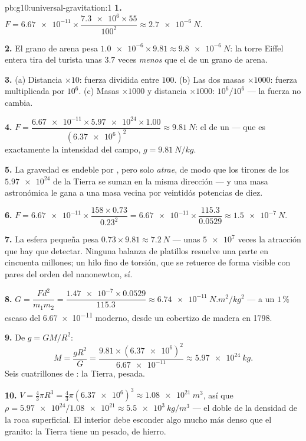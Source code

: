 \begin{solution}{pb:g10:universal-gravitation:1}
\textbf{1.} $F = \num{6.67e-11} \times
\dfrac{\num{7.3e6} \times 55}{100^2} \approx \qty{2.7e-6}{N}$.

\textbf{2.} El grano de arena pesa
$\num{1.0e-6} \times 9.81 \approx \qty{9.8e-6}{N}$: la torre Eiffel
entera tira del turista unas $3.7$ veces \emph{menos} que el  de un
grano de arena.

\textbf{3.} (a) Distancia $\times 10$: fuerza dividida entre $100$.
(b) Las dos masas $\times 1000$: fuerza multiplicada por $10^6$.
(c) Masas $\times 1000$ y distancia $\times 1000$: $10^6 / 10^6$ --- la
fuerza no cambia.

\textbf{4.} $F = \dfrac{\num{6.67e-11} \times \num{5.97e24} \times
1.00}{(\num{6.37e6})^2} \approx \qty{9.81}{N}$: el  de un 
--- que es exactamente la intensidad del campo,
$g = \qty{9.81}{N/kg}$.

\textbf{5.} La gravedad es endeble por , pero solo
\emph{atrae}, de modo que los tirones de los $\num{5.97e24}$ 
de la Tierra se suman en la misma dirección --- y una masa astronómica
le gana a una masa vecina por veintidós potencias de diez.

\textbf{6.} $F = \num{6.67e-11} \times \dfrac{158 \times 0.73}{0.23^2}
= \num{6.67e-11} \times \dfrac{115.3}{0.0529}
\approx \qty{1.5e-7}{N}$.

\textbf{7.} La esfera pequeña pesa
$0.73 \times 9.81 \approx \qty{7.2}{N}$ --- unas $\num{5e7}$ veces la
atracción que hay que detectar. Ninguna balanza de platillos resuelve
una parte en cincuenta millones; un hilo fino de torsión, que se
retuerce de forma visible con pares del orden del nanonewton, sí.

\textbf{8.} $G = \dfrac{F d^2}{m_1 m_2}
= \dfrac{\num{1.47e-7} \times 0.0529}{115.3}
\approx \qty{6.74e-11}{N.m^2/kg^2}$ --- a un $1\,\%$ escaso del
\num{6.67e-11} moderno, desde un cobertizo de madera en 1798.

\textbf{9.} De $g = G M / R^2$:
\[
M = \frac{g R^2}{G}
= \frac{9.81 \times (\num{6.37e6})^2}{\num{6.67e-11}}
\approx \qty{5.97e24}{kg}.
\]
Seis cuatrillones de : la Tierra, pesada.

\textbf{10.} $V = \frac43 \pi R^3 = \frac43 \pi
(\num{6.37e6})^3 \approx \qty{1.08e21}{m^3}$, así que
$\rho = \num{5.97e24}/\num{1.08e21} \approx \qty{5.5e3}{kg/m^3}$ --- el
doble de la densidad de la roca superficial. El interior debe esconder
algo mucho más denso que el granito: la Tierra tiene un  pesado,
de hierro.


\end{solution}

